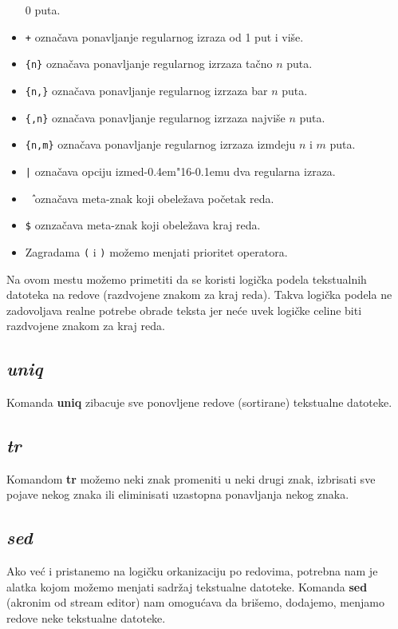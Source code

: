 \documentclass[12pt,a4paper,titlepage]{article}
\def\d{d\kern-0.4em\char"16\kern-0.1em}
\begin{document}
\begin{itemize}
        0 puta.
      \item
        {\tt+} ozna\v cava ponavljanje regularnog izraza od 1 put i vi\v se.
      \item
        {\tt\{n\}} ozna\v cava ponavljanje regularnog izrzaza ta\v cno $n$
        puta.
      \item
        {\tt\{n,\}} ozna\v cava ponavljanje regularnog izrzaza bar $n$ puta.
      \item
        {\tt\{,n\}} ozna\v cava ponavljanje regularnog izrzaza najvi\v se $n$
        puta.
      \item
        {\tt\{n,m\}} ozna\v cava ponavljanje regularnog izrzaza izmdeju $n$ i
        $m$ puta.
      \item
        {\tt|} ozna\v cava opciju izme\d u dva regularna izraza.
      \item
        {\tt\^\ } ozna\v cava meta-znak koji obele\v zava po\v cetak reda.
      \item
        {\tt\$} oznza\v cava meta-znak koji obele\v zava kraj reda.
      \item
        Zagradama {\tt(} i {\tt)} mo\v zemo menjati prioritet operatora.
      \end{itemize}

      Na ovom mestu mo\v zemo primetiti da se koristi logi\v cka podela
      tekstualnih datoteka na redove (razdvojene znakom za kraj reda).
      Takva logi\v cka podela ne zadovoljava realne potrebe obrade teksta
      jer ne\'ce uvek logi\v cke celine biti razdvojene znakom za kraj reda.
%
    \subsection{\em uniq}
      Komanda {\bf uniq} zibacuje sve ponovljene redove (sortirane) tekstualne
      datoteke.
%
    \subsection{\em tr}
      Komandom {\bf tr} mo\v zemo neki znak promeniti u neki drugi znak,
      izbrisati sve pojave nekog znaka ili eliminisati uzastopna ponavljanja
      nekog znaka.
%
    \subsection{\em sed}
      Ako ve\'c i pristanemo na logi\v cku orkanizaciju po redovima, potrebna
      nam je alatka kojom mo\v zemo menjati sadr\v zaj tekstualne datoteke.
      Komanda {\bf sed} (akronim od stream editor) nam omogu\'cava da
      bri\v semo, dodajemo, menjamo redove neke tekstualne datoteke.
\end{document}

